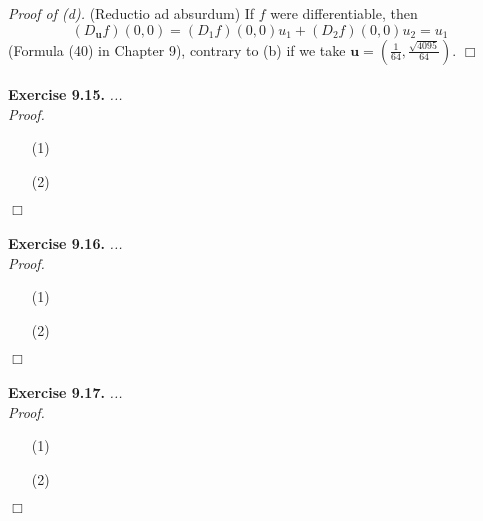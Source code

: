 \documentclass{article}
\begin{document}
\emph{Proof of (d).}
  (Reductio ad absurdum)
  If $f$ were differentiable,
  then
  \[
    (D_{\mathbf{u}}f)(0,0) = (D_1 f)(0,0)u_1 + (D_2 f)(0,0)u_2 = u_1
  \]
  (Formula (40) in Chapter 9), contrary to (b)
  if we take $\mathbf{u} = \left(\frac{1}{64}, \frac{\sqrt{4095}}{64} \right)$.
$\Box$ \\\\






\textbf{Exercise 9.15.}
\emph{...} \\

\emph{Proof.}
\begin{enumerate}
\item[(1)]
\item[(2)]

\end{enumerate}
$\Box$ \\\\






\textbf{Exercise 9.16.}
\emph{...} \\

\emph{Proof.}
\begin{enumerate}
\item[(1)]
\item[(2)]

\end{enumerate}
$\Box$ \\\\






\textbf{Exercise 9.17.}
\emph{...} \\

\emph{Proof.}
\begin{enumerate}
\item[(1)]
\item[(2)]

\end{enumerate}
$\Box$ \\\\
\end{document}
